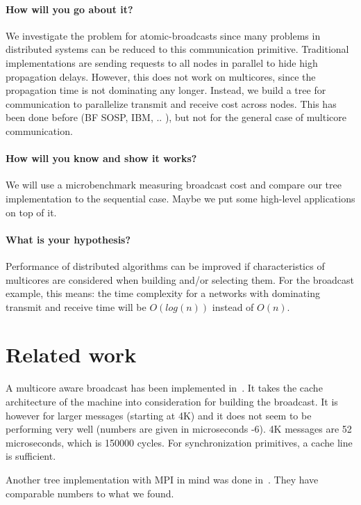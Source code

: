 \documentclass{article}
\begin{document}
\paragraph{How will you go about it?} We investigate the problem for
atomic-broadcasts since many problems in distributed systems can be
reduced to this communication primitive. Traditional implementations
are sending requests to all nodes in parallel to hide high propagation
delays. %
However, this does not work on multicores, since the propagation time
is not dominating any longer. %
Instead, we build a tree for communication to parallelize transmit and
receive cost across nodes. This has been done before (BF SOSP, IBM,
.. ), but not for the general case of multicore communication. 

\paragraph{How will you know and show it works?} We will use a
microbenchmark measuring broadcast cost and compare our tree
implementation to the sequential case. Maybe we put some high-level
applications on top of it.

\paragraph{What is your hypothesis?} Performance of distributed
algorithms can be improved if characteristics of multicores are
considered when building and/or selecting them. %
For the broadcast example, this means: the time complexity for a
networks with dominating transmit and receive time will be $O(log(n))$
instead of $O(n)$.

\section{Related work}

A multicore aware broadcast has been implemented in~\cite{Tu2008}. It
takes the cache architecture of the machine into consideration for
building the broadcast. It is however for larger messages (starting at
4K) and it does not seem to be performing very well (numbers are given
in microseconds -6). 4K messages are 52 microseconds, which is 150000
cycles. For synchronization primitives, a cache line is sufficient.

Another tree implementation with MPI in mind was done
in~\cite{Graham2008}. They have comparable numbers to what we found. 
\end{document}
